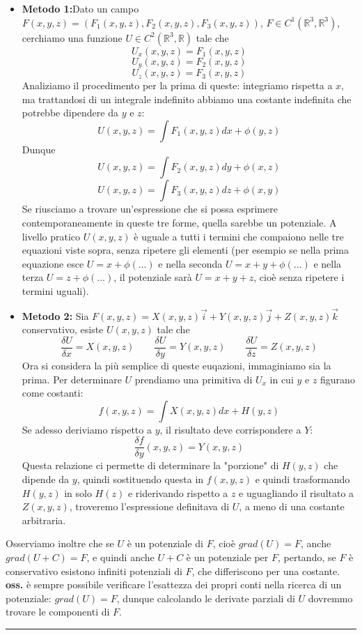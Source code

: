\begin{itemize}
    \item \textbf{Metodo 1:}Dato un campo $F(x,y,z) = (F_1(x,y,z), F_2(x,y,z), F_3(x,y,z))$, $F \in C^1(\mathbb{R}^3, \mathbb{R}^3)$, cerchiamo una funzione $U \in C^2(\mathbb{R}^3, \mathbb{R})$ tale che
    \[
        U_x(x,y,z) = F_1(x,y,z)
    \]
    \[
        U_y(x,y,z) = F_2(x,y,z)
    \]
    \[
        U_z(x,y,z) = F_3(x,y,z)
    \]
    Analiziamo il procedimento per la prima di queste: integriamo rispetta a $x$, ma trattandosi di un integrale indefinito abbiamo una costante indefinita che potrebbe dipendere da $y$ e $z$:
    \[
        U(x,y,z) = \int F_1(x,y,z)dx + \phi(y,z)
    \]
    Dunque
    \[
        U(x,y,z) = \int F_2(x,y,z)dy + \phi(x,z)
    \]
    \[
        U(x,y,z) = \int F_3(x,y,z)dz + \phi(x,y)
    \]
    Se riusciamo a trovare un'espressione che si possa esprimere contemporaneamente in queste tre forme, quella sarebbe un potenziale. A livello pratico $U(x,y,z)$ è uguale a tutti i termini che compaiono nelle tre equazioni viste sopra, senza ripetere gli elementi (per esempio se nella prima equazione esce $U = x + \phi(...)$ e nella seconda $U = x + y + \phi(...)$ e nella terza $U = z + \phi(...)$, il potenziale sarà $U = x +y +z$, cioè senza ripetere i termini uguali).
    \item \textbf{Metodo 2:} Sia $F(x,y,z) = X(x,y,z)\vec{i} + Y(x,y,z)\vec{j} + Z(x,y,z)\vec{k}$ conservativo, esiste $U(x,y,z)$ tale che
    \[
        \frac{\delta U}{\delta x} = X(x,y,z) \quad \quad \frac{\delta U}{\delta y} = Y(x,y,z) \quad \quad \frac{\delta U}{\delta z} = Z(x,y,z)
    \]
    Ora si considera la più semplice di queste euqazioni, immaginiamo sia la prima.\newline
    Per determinare $U$ prendiamo una primitiva di $U_x$ in cui $y$ e $z$ figurano come costanti:
    \[
        f(x,y,z) = \int X(x,y,z)dx + H(y,z)
    \]
    Se adesso deriviamo rispetto a $y$, il risultato deve corrispondere a $Y$:
    \[
        \frac{\delta f}{\delta y}(x,y,z) = Y (x,y,z)
    \]
    Questa relazione ci permette di determinare la "porzione" di $H(y,z)$ che dipende da $y$, quindi sostituendo questa in $f(x,y,z)$ e quindi trasformando $H(y,z)$ in solo $H(z)$ e riderivando rispetto a $z$ e uguagliando il risultato a $Z(x,y,z)$, troveremo l'espressione definitava di $U$, a meno di una costante arbitraria. 
\end{itemize}
Osserviamo inoltre che se $U$ è un potenziale di $F$, cioè $grad(U) = F$, anche $grad(U+C) = F$, e quindi anche $U+C$ è un potenziale per $F$, pertando, se $F$ è conservativo esistono infiniti potenziali di $F$, che differiscono per una costante.\newline
\newline
\textbf{oss.} è sempre possibile  verificare l'esattezza dei propri conti nella ricerca di un potenziale: $grad(U) = F$, dunque calcolando le derivate parziali di $U$ dovremmo trovare le componenti di $F$.
\rule{\textwidth}{0,4pt}
